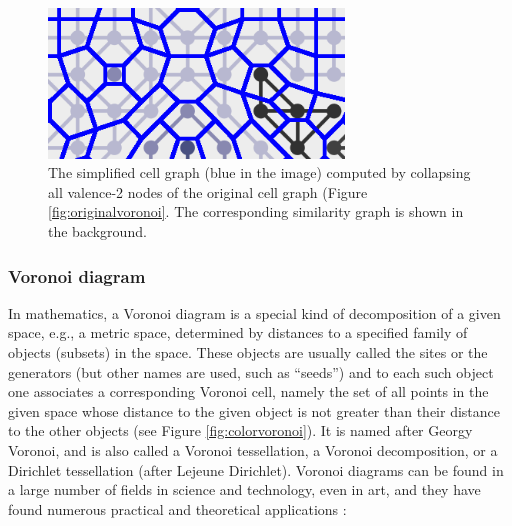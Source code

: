 \documentclass[]{usiinfbachelorproject}
\begin{document}
\begin{figure}[ht]
	\centering
	\includegraphics[width=0.7\textwidth]{img/voronoi2.png}
	\caption{The simplified cell graph (blue in the image) computed by collapsing all valence-2 nodes of the original cell graph (Figure \ref{fig:originalvoronoi}. The corresponding similarity graph is shown in the background.}
	\label{fig:simplevoronoi}
\end{figure}

\subsubsection{Voronoi diagram} \label{sec:voronoi}

In mathematics, a Voronoi diagram is a special kind of decomposition of a given space, e.g., a metric space, determined by distances to a specified family of objects (subsets) in the space. These objects are usually called the sites or the generators (but other names are used, such as ``seeds'') and to each such object one associates a corresponding Voronoi cell, namely the set of all points in the given space whose distance to the given object is not greater than their distance to the other objects (see Figure \ref{fig:colorvoronoi}). It is named after Georgy Voronoi, and is also called a Voronoi tessellation, a Voronoi decomposition, or a Dirichlet tessellation (after Lejeune Dirichlet). Voronoi diagrams can be found in a large number of fields in science and technology, even in art, and they have found numerous practical and theoretical applications \cite{Aurenhammer1991}:
\end{document}
